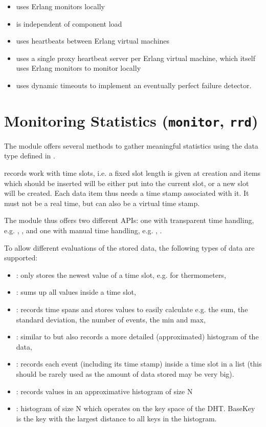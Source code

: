 \begin{itemize}
\item uses Erlang monitors locally
\item is independent of component load
\item uses heartbeats between Erlang virtual machines
\item uses a single proxy heartbeat server per Erlang virtual machine, which
  itself uses Erlang monitors to monitor locally
\item uses dynamic timeouts to implement an eventually perfect failure detector.
\end{itemize}

\section{Monitoring Statistics (\texttt{monitor}, \texttt{rrd})}

The  module offers several methods to gather meaningful
statistics using the  data type defined in .

 records work with time slots, i.e. a fixed slot length is given
at creation and items which should be inserted will be either put into the
current slot, or a new slot will be created.
Each data item thus needs a time stamp associated with it. It must not be a
real time, but can also be a virtual time stamp.

The  module thus offers two different APIs:
one with transparent time handling, e.g.
 , , and
one with manual time handling, e.g.
 , .

To allow different evaluations of the stored data, the following types of data
are supported:
\begin{itemize}
  \item {}: only stores the newest value of a time slot, e.g. for thermometers,
  \item {}: sums up all values inside a time slot,
  \item {}: records time spans and stores values to easily calculate e.g. the sum, the
  standard deviation, the number of events, the min and max,
  \item {}: similar to  but also records a more detailed
  (approximated) histogram of the data,
  \item {}: records each event (including its time stamp) inside a time slot in a list
  (this should be rarely used as the amount of data stored may be very big).
  \item {}: records values in an approximative histogram of size N
  \item {}: histogram of size N which
    operates on the key space of the DHT. BaseKey is the key with the
    largest distance to all keys in the histogram.
\end{itemize}

